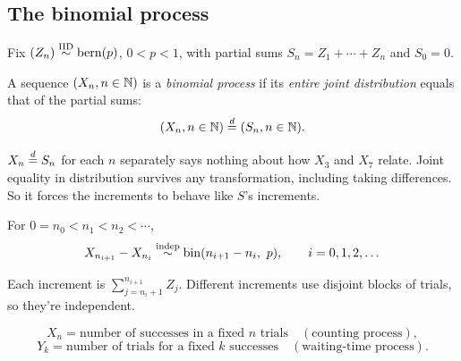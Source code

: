 \subsection{The binomial process}

Fix $(Z_n)\overset{\text{IID}}{\sim}\operatorname{bern}(p)$, $0<p<1$, with partial sums $S_n = Z_1+\cdots+Z_n$ and $S_0 = 0$.

\begin{definition}
A sequence $(X_n, n\in\mathbb{N})$ is a \emph{binomial process} if its \emph{entire joint distribution} equals that of the partial sums:
\[
(X_n, n \in \mathbb{N}) \overset{d}{=} (S_n, n \in \mathbb{N}).
\]
\end{definition}

\begin{remark}
$X_n \overset{d}{=} S_n$ for each $n$ separately says nothing about how $X_3$ and $X_7$ relate. Joint equality in distribution survives any transformation, including taking differences. So it forces the increments to behave like $S$'s increments.
\end{remark}

\begin{proposition}
For $0 = n_0 < n_1 < n_2 < \cdots$,
\[
X_{n_{i+1}} - X_{n_i} \overset{\text{indep}}{\sim} \operatorname{bin}(n_{i+1}-n_i,\ p), \qquad i = 0,1,2,\dots
\]
\end{proposition}
\begin{remark}
Each increment is $\sum_{j=n_i+1}^{n_{i+1}} Z_j$. Different increments use disjoint blocks of trials, so they're independent.
\end{remark}

\begin{definition}
\[
X_n = \text{number of successes in a fixed } n \text{ trials} \quad (\text{counting process}),
\]
\[
Y_k = \text{number of trials for a fixed } k \text{ successes} \quad (\text{waiting-time process}).
\]
\end{definition}

